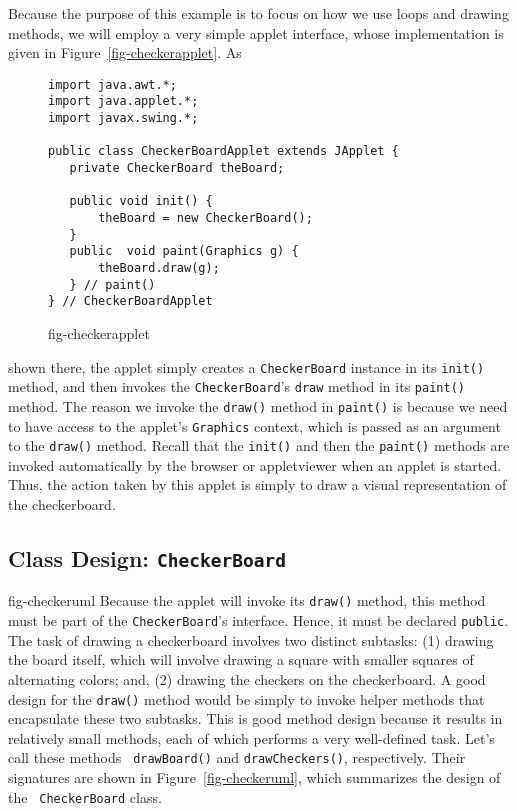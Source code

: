 Because the purpose of this example is to focus on how we use loops
and drawing methods, we will employ a very simple applet interface,
whose implementation is given in Figure~\ref{fig-checkerapplet}.  As
\begin{figure}[h]
\jjjprogstart
\begin{jjjlisting}
\begin{lstlisting}
import java.awt.*;
import java.applet.*;
import javax.swing.*;

public class CheckerBoardApplet extends JApplet {
   private CheckerBoard theBoard;

   public void init() {
       theBoard = new CheckerBoard();
   }
   public  void paint(Graphics g) {
       theBoard.draw(g);
   } // paint()
} // CheckerBoardApplet
\end{lstlisting}
\end{jjjlisting}
{fig-checkerapplet}
\end{figure}
shown there, the applet simply creates a {\tt CheckerBoard} instance
in its {\tt init()} method, and then invokes the {\tt CheckerBoard}'s
{\tt draw} method in its {\tt paint()} method. The reason we invoke
the {\tt draw()} method in {\tt paint()} is because we need to have
access to the applet's {\tt Graphics} context, which is passed as an
argument to the {\tt draw()} method. Recall that the {\tt init()} and
then the {\tt paint()} methods are invoked automatically by the
browser or appletviewer when an applet is started.  Thus, the action
taken by this applet is simply to draw a visual representation of the
checkerboard.


\subsection*{Class Design: {\tt CheckerBoard}}
{fig-checkeruml}
\noindent Because the applet will invoke its {\tt draw()} method, this
method must be part of the {\tt CheckerBoard}'s interface.  Hence, it
must be declared {\tt public}.  The task of drawing a checkerboard
involves two distinct subtasks: (1) drawing the board itself, which
will involve drawing a square with smaller squares of alternating
colors; and, (2) drawing the checkers on the checkerboard.  A good
design for the {\tt draw()} method would be simply to invoke helper
methods that encapsulate these two subtasks. This is good method
design because it results in relatively small methods, each of which
performs a very well-defined task.  Let's call these methods {\tt
drawBoard()} and {\tt drawCheckers()}, respectively.  Their signatures
are shown in Figure~\ref{fig-checkeruml}, which summarizes the design of the {\tt
CheckerBoard} class.

